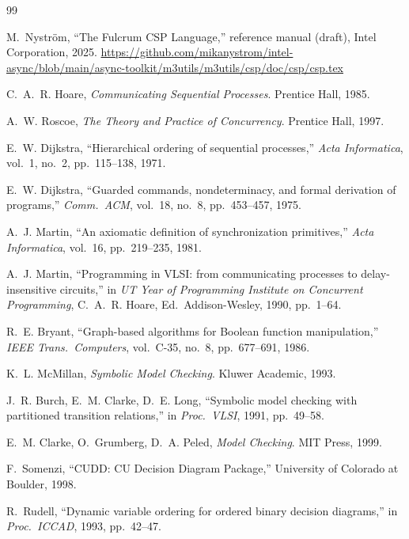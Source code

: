\documentclass[11pt]{article}
\begin{document}
\begin{thebibliography}{99}

M.~Nystr\"om,
``The Fulcrum CSP Language,'' reference manual (draft),
Intel Corporation, 2025.
\url{https://github.com/mikanystrom/intel-async/blob/main/async-toolkit/m3utils/m3utils/csp/doc/csp/csp.tex}

C.~A.~R. Hoare,
\emph{Communicating Sequential Processes}.
Prentice Hall, 1985.

A.~W. Roscoe,
\emph{The Theory and Practice of Concurrency}.
Prentice Hall, 1997.

E.~W. Dijkstra,
``Hierarchical ordering of sequential processes,''
\emph{Acta Informatica}, vol.~1, no.~2, pp.~115--138, 1971.

E.~W. Dijkstra,
``Guarded commands, nondeterminacy, and formal derivation of programs,''
\emph{Comm.\ ACM}, vol.~18, no.~8, pp.~453--457, 1975.

A.~J. Martin,
``An axiomatic definition of synchronization primitives,''
\emph{Acta Informatica}, vol.~16, pp.~219--235, 1981.

A.~J. Martin,
``Programming in VLSI: from communicating processes to delay-insensitive
circuits,''
in \emph{UT Year of Programming Institute on Concurrent Programming},
C.~A.~R. Hoare, Ed.\
Addison-Wesley, 1990, pp.~1--64.

R.~E. Bryant,
``Graph-based algorithms for Boolean function manipulation,''
\emph{IEEE Trans.\ Computers}, vol.~C-35, no.~8, pp.~677--691, 1986.

K.~L. McMillan,
\emph{Symbolic Model Checking}.
Kluwer Academic, 1993.

J.~R. Burch, E.~M. Clarke, D.~E. Long,
``Symbolic model checking with partitioned transition relations,''
in \emph{Proc.\ VLSI}, 1991, pp.~49--58.

E.~M. Clarke, O.~Grumberg, D.~A. Peled,
\emph{Model Checking}.
MIT Press, 1999.

F.~Somenzi,
``CUDD: CU Decision Diagram Package,''
University of Colorado at Boulder, 1998.

R.~Rudell,
``Dynamic variable ordering for ordered binary decision diagrams,''
in \emph{Proc.\ ICCAD}, 1993, pp.~42--47.

\end{thebibliography}
\end{document}
